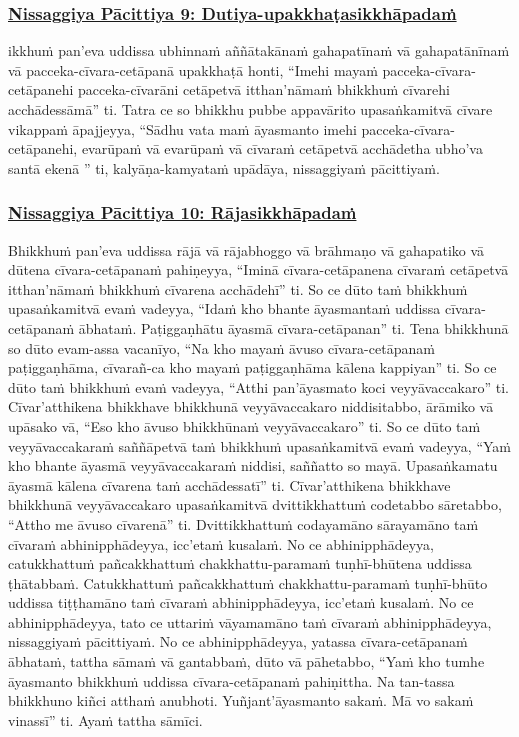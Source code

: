 \subsubsection*{\hyperref[forf-exp9]{Nissaggiya Pācittiya 9: Dutiya-upakkhaṭasikkhāpadaṁ}}
\label{np9}

ikkhuṁ pan’eva uddissa ubhinnaṁ aññātakānaṁ gahapatīnaṁ vā gahapatānīnaṁ vā pacceka-cīvara-cetāpanā upakkhaṭā honti, “Imehi mayaṁ pacceka-cīvara-cetāpanehi pacceka-cīvarāni cetāpetvā itthan'nāmaṁ bhikkhuṁ cīvarehi acchādessāmā” ti. Tatra ce so bhikkhu pubbe appavārito upasaṅkamitvā cīvare vikappaṁ āpajjeyya, “Sādhu vata maṁ āyasmanto imehi pacceka-cīvara-cetāpanehi, evarūpaṁ vā evarūpaṁ vā cīvaraṁ cetāpetvā acchādetha ubho’va santā ekenā ” ti, kalyāṇa-kamyataṁ upādāya, nissaggiyaṁ pācittiyaṁ.

\subsubsection*{\hyperref[forf-exp10]{Nissaggiya Pācittiya 10: Rājasikkhāpadaṁ}}
\label{np10}

Bhikkhuṁ pan’eva uddissa rājā vā rājabhoggo vā brāhmaṇo vā gahapatiko vā dūtena cīvara-cetāpanaṁ pahiṇeyya, “Iminā cīvara-cetāpanena cīvaraṁ cetāpetvā itthan'nāmaṁ bhikkhuṁ cīvarena acchādehī” ti. So ce dūto taṁ bhikkhuṁ upasaṅkamitvā evaṁ vadeyya, “Idaṁ kho bhante āyasmantaṁ uddissa cīvara-cetāpanaṁ ābhataṁ. Paṭiggaṇhātu āyasmā cīvara-cetāpanan” ti. Tena bhikkhunā so dūto evam-assa vacanīyo, “Na kho mayaṁ āvuso cīvara-cetāpanaṁ paṭiggaṇhāma, cīvarañ-ca kho mayaṁ paṭiggaṇhāma kālena kappiyan” ti. So ce dūto taṁ bhikkhuṁ evaṁ vadeyya, “Atthi pan’āyasmato koci veyyāvaccakaro” ti. Cīvar’atthikena bhikkhave bhikkhunā veyyāvaccakaro niddisitabbo, ārāmiko vā upāsako vā, “Eso kho āvuso bhikkhūnaṁ veyyāvaccakaro” ti. So ce dūto taṁ veyyāvaccakaraṁ saññāpetvā taṁ bhikkhuṁ upasaṅkamitvā evaṁ vadeyya, “Yaṁ kho bhante āyasmā veyyāvaccakaraṁ niddisi, saññatto so mayā. Upasaṅkamatu āyasmā kālena cīvarena taṁ acchādessatī” ti. Cīvar’atthikena bhikkhave bhikkhunā veyyāvaccakaro upasaṅkamitvā dvittikkhattuṁ codetabbo sāretabbo, “Attho me āvuso cīvarenā” ti. Dvittikkhattuṁ codayamāno sārayamāno taṁ cīvaraṁ abhinipphādeyya, icc’etaṁ kusalaṁ. No ce abhinipphādeyya, catukkhattuṁ pañcakkhattuṁ chakkhattu-paramaṁ tuṇhī-bhūtena uddissa ṭhātabbaṁ. Catukkhattuṁ pañcakkhattuṁ chakkhattu-paramaṁ tuṇhī-bhūto uddissa tiṭṭhamāno taṁ cīvaraṁ abhinipphādeyya, icc’etaṁ kusalaṁ. No ce abhinipphādeyya, tato ce uttariṁ vāyamamāno taṁ cīvaraṁ abhinipphādeyya, nissaggiyaṁ pācittiyaṁ. No ce abhinipphādeyya, yatassa cīvara-cetāpanaṁ ābhataṁ, tattha sāmaṁ vā gantabbaṁ, dūto vā pāhetabbo, “Yaṁ kho tumhe āyasmanto bhikkhuṁ uddissa cīvara-cetāpanaṁ pahiṇittha. Na tan-tassa bhikkhuno kiñci atthaṁ anubhoti. Yuñjant’āyasmanto sakaṁ. Mā vo sakaṁ vinassī” ti. Ayaṁ tattha sāmīci.

